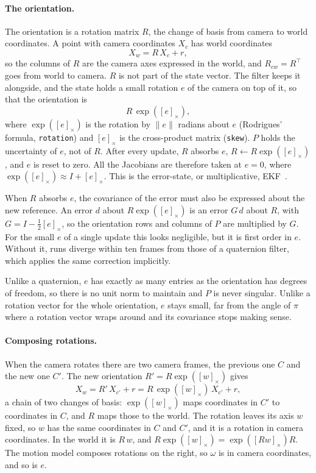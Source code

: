\documentclass[11pt]{article}
\begin{document}
\paragraph{The orientation.}
The orientation is a rotation matrix $R$, the change of basis from camera to world coordinates. A
point with camera coordinates $X_c$ has world coordinates
\begin{equation}
  X_w = R\, X_c + r,
\end{equation}
so the columns of $R$ are the camera axes expressed in the world, and $R_{cw} = R^\top$ goes from
world to camera. $R$ is not part of the state vector. The filter keeps it alongside, and the state
holds a small rotation $e$ of the camera on top of it, so that the orientation is
\begin{equation}
  R\, \exp([e]_\times),
\end{equation}
where $\exp([e]_\times)$ is the rotation by $\|e\|$ radians about $e$ (Rodrigues' formula,
\texttt{rotation}) and $[e]_\times$ is the cross-product matrix (\texttt{skew}). $P$ holds the
uncertainty of $e$, not of $R$. After every update, $R$ absorbs $e$,
$R \leftarrow R \exp([e]_\times)$, and $e$ is reset to zero. All the Jacobians are therefore taken
at $e = 0$, where $\exp([e]_\times) \approx I + [e]_\times$. This is the error-state, or
multiplicative, EKF~\cite{lefferts1982}.

When $R$ absorbs $e$, the covariance of the error must also be expressed about the new
reference. An
error $d$ about $R \exp([e]_\times)$ is an error $G\, d$ about $R$, with
$G = I - \frac{1}{2} [e]_\times$, so the orientation rows and columns of $P$ are multiplied by $G$.
For the small $e$ of a single update this looks negligible, but it is first order in $e$. Without
it, runs diverge within ten frames from those of a quaternion filter, which applies the same
correction implicitly.

Unlike a quaternion, $e$ has exactly as many entries as the orientation has degrees of freedom, so
there is no unit norm to maintain and $P$ is never singular. Unlike a rotation vector for the whole
orientation, $e$ stays small, far from the angle of $\pi$ where a rotation vector wraps around and
its covariance stops making sense.

\paragraph{Composing rotations.}
When the camera rotates there are two camera frames, the previous one $C$ and the new one $C'$.
The new orientation $R' = R \exp([w]_\times)$ gives
\begin{equation}
  X_w = R'\, X_{c'} + r = R\, \exp([w]_\times)\, X_{c'} + r,
\end{equation}
a chain of two changes of basis: $\exp([w]_\times)$ maps coordinates in $C'$ to coordinates in
$C$, and $R$ maps those to the world. The rotation leaves its axis $w$ fixed, so $w$ has the same
coordinates in $C$ and $C'$, and it is a rotation in camera coordinates. In the world it is
$R\, w$, and $R \exp([w]_\times) = \exp([R w]_\times) R$. The motion model composes rotations on
the right, so $\omega$ is in camera coordinates, and so is $e$.
\end{document}
